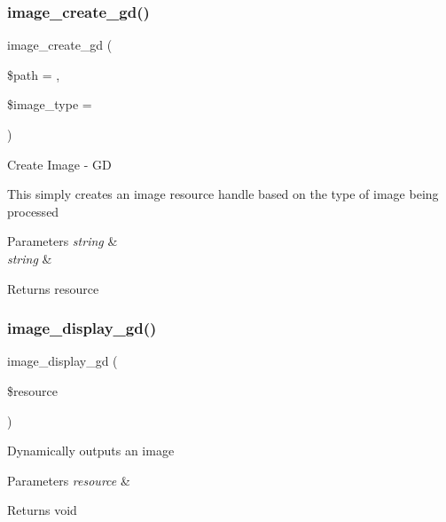 \subsubsection{\texorpdfstring{image\+\_\+create\+\_\+gd()}{image\_create\_gd()}}
{\footnotesize\ttfamily image\+\_\+create\+\_\+gd (\begin{DoxyParamCaption}\item[{}]{\$path = {\ttfamily \textquotesingle{}\textquotesingle{}},  }\item[{}]{\$image\+\_\+type = {\ttfamily \textquotesingle{}\textquotesingle{}} }\end{DoxyParamCaption})}

Create Image -\/ GD

This simply creates an image resource handle based on the type of image being processed


\begin{DoxyParams}{Parameters}
{\em string} & \\
\hline
{\em string} & \\
\hline
\end{DoxyParams}
\begin{DoxyReturn}{Returns}
resource 
\end{DoxyReturn}
\mbox{\label{class_c_i___image__lib_af641d1806701b178dfba3dbf7da54462}} 
\subsubsection{\texorpdfstring{image\+\_\+display\+\_\+gd()}{image\_display\_gd()}}
{\footnotesize\ttfamily image\+\_\+display\+\_\+gd (\begin{DoxyParamCaption}\item[{}]{\$resource }\end{DoxyParamCaption})}

Dynamically outputs an image


\begin{DoxyParams}{Parameters}
{\em resource} & \\
\hline
\end{DoxyParams}
\begin{DoxyReturn}{Returns}
void 
\end{DoxyReturn}
\mbox{\label{class_c_i___image__lib_a3f6d47ec077726da699890d4644797ad}} 
